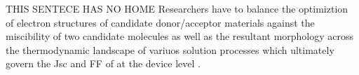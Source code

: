 THIS SENTECE HAS NO HOME Researchers have to
balance the optimiztion of electron structures of candidate donor/acceptor materials against the miscibility
of two candidate molecules as well as the resultant morphology across the thermodynamic landscape of
variuos solution processes which ultimately govern the Jsc and FF of at the device level \cite{Zhu2020a}. 
